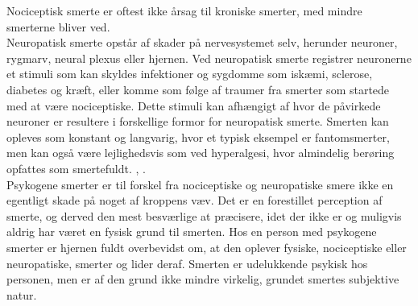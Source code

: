 Nociceptisk smerte er oftest ikke årsag til kroniske smerter, med mindre smerterne bliver ved.\\ 
Neuropatisk smerte opstår af skader på nervesystemet selv, herunder neuroner, rygmarv, neural plexus eller hjernen. 
Ved neuropatisk smerte registrer neuronerne et stimuli som kan skyldes infektioner og sygdomme som iskæmi, sclerose, diabetes og kræft, eller komme som følge af traumer fra smerter som startede med at være nociceptiske. Dette stimuli kan afhængigt af hvor de påvirkede neuroner er resultere i forskellige formor for neuropatisk smerte. Smerten kan opleves som konstant og langvarig, hvor et typisk eksempel er fantomsmerter, men kan også være lejlighedsvis som ved hyperalgesi, hvor almindelig berøring opfattes som smertefuldt. \citep{Giangregorio1997}, \citep{Carmon}.\\
Psykogene smerter er til forskel fra nociceptiske og neuropatiske smere ikke en egentligt skade på noget af kroppens væv. Det er en forestillet perception af smerte, og derved den mest besværlige at præcisere, idet der ikke er og muligvis aldrig har været en fysisk grund til smerten. Hos en person med psykogene smerter er hjernen fuldt overbevidst om, at den oplever fysiske, nociceptiske eller neuropatiske, smerter og lider deraf. Smerten er udelukkende psykisk hos personen, men er af den grund ikke mindre virkelig, grundet smertes subjektive natur. \citep{Giangregorio1997}




